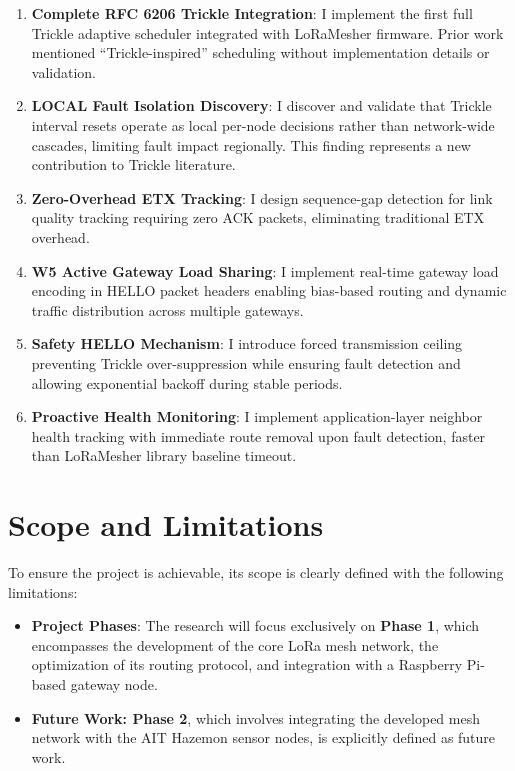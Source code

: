 \begin{enumerate}
\item \textbf{Complete RFC 6206 Trickle Integration}: I implement the first full Trickle adaptive scheduler integrated with LoRaMesher firmware. Prior work mentioned ``Trickle-inspired'' scheduling without implementation details or validation.

\item \textbf{LOCAL Fault Isolation Discovery}: I discover and validate that Trickle interval resets operate as local per-node decisions rather than network-wide cascades, limiting fault impact regionally. This finding represents a new contribution to Trickle literature.

\item \textbf{Zero-Overhead ETX Tracking}: I design sequence-gap detection for link quality tracking requiring zero ACK packets, eliminating traditional ETX overhead.

\item \textbf{W5 Active Gateway Load Sharing}: I implement real-time gateway load encoding in HELLO packet headers enabling bias-based routing and dynamic traffic distribution across multiple gateways.

\item \textbf{Safety HELLO Mechanism}: I introduce forced transmission ceiling preventing Trickle over-suppression while ensuring fault detection and allowing exponential backoff during stable periods.

\item \textbf{Proactive Health Monitoring}: I implement application-layer neighbor health tracking with immediate route removal upon fault detection, faster than LoRaMesher library baseline timeout.
\end{enumerate}

\section{Scope and Limitations}
\label{sec:scope}

To ensure the project is achievable, its scope is clearly defined with the following limitations:

\begin{itemize}
\item \textbf{Project Phases}: The research will focus exclusively on \textbf{Phase 1}, which encompasses the development of the core LoRa mesh network, the optimization of its routing protocol, and integration with a Raspberry Pi-based gateway node.

\item \textbf{Future Work: Phase 2}, which involves integrating the developed mesh network with the AIT Hazemon sensor nodes, is explicitly defined as future work.
\end{itemize}

